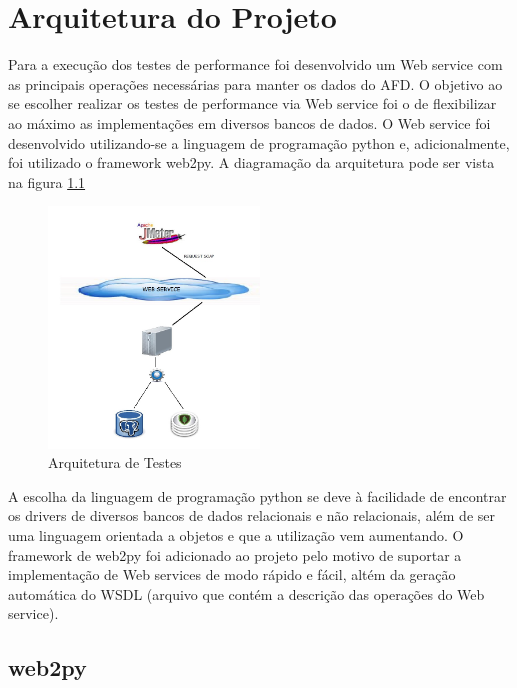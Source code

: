 \chapter{Arquitetura do Projeto}

Para a execução dos testes de performance foi desenvolvido um Web service com as principais operações necessárias para manter os dados do AFD. O objetivo ao se escolher realizar os testes de performance via Web service foi o de flexibilizar ao máximo as implementações em diversos bancos de dados. O Web service foi desenvolvido utilizando-se a linguagem de programação python e, adicionalmente, foi utilizado o framework web2py. A diagramação da arquitetura pode ser vista na figura \ref{fig:arquitetura}

	\begin{figure}[!htbp]
		\begin{center}
			\includegraphics[width=0.5\textwidth]{arquitetura}
		\end{center}
		\caption{Arquitetura de Testes}
		\label{fig:arquitetura}
	\end{figure}

A escolha da linguagem de programação python se deve à facilidade de encontrar os drivers de diversos bancos de dados relacionais e não relacionais, além de ser uma linguagem orientada a objetos e que a utilização vem aumentando. O framework de web2py foi adicionado ao projeto pelo motivo de suportar a implementação de Web services de modo rápido e fácil, altém da geração automática do WSDL (arquivo que contém a descrição das operações do Web service).



\section{web2py}

